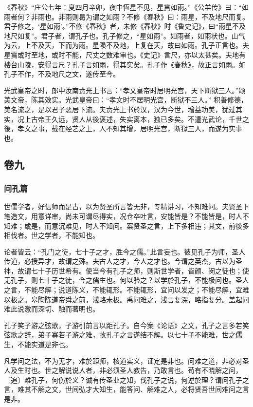 \documentclass[]{article}
\begin{document}
《春秋》``庄公七年：夏四月辛卯，夜中恆星不见，星霣如雨。''《公羊传》曰：``如雨者何？非雨也。非雨则曷为谓之如雨？不修《春秋》曰：雨星，不及地尺而复。君子修之，`星如雨'。''不修《春秋》者，未修《春秋》时《鲁史记》，曰``雨星不及地尺如复''。君子者，谓孔子也。孔子修之，``星如雨''。如雨者，如雨状也。山气为云，上不及天，下而为雨。星陨不及地，上复在天，故曰如雨。孔子正言也。夫星霣或时至地，或时不能，尺丈之数难审也。《史记》言尺，亦以太甚矣。夫地有楼台山陵，安得言尺？孔子言如雨，得其实矣。孔子作《春秋》，故正言如雨。如孔子不作，不及地尺之文，遂传至今。

光武皇帝之时，郎中汝南贲光上书言：``孝文皇帝时居明光宫，天下断狱三人。''颂美文帝，陈其效实。光武皇帝曰：``孝文时不居明光宫，断狱不三人。''
积善修德，美名流之，是以君子恶居下流。夫贲光上书於汉，汉为今世，增益功美，犹过其实，况上古帝王久远，贤人从後褒述，失实离本，独已多矣。不遭光武论，千世之後，孝文之事，载在经艺之上，人不知其增，居明光宫，断狱三人，而遂为实事也。

\hypertarget{header-n367}{%
\subsection{卷九}\label{header-n367}}

\hypertarget{header-n368}{%
\subsubsection{问孔篇}\label{header-n368}}

世儒学者，好信师而是古，以为贤圣所言皆无非，专精讲习，不知难问。夫贤圣下笔造文，用意详审，尚未可谓尽得实，况仓卒吐言，安能皆是？不能皆是，时人不知难；或是，而意沉难见，时人不知问。案贤圣之言，上下多相违；其文，前後多相伐者。世之学者，不能知也。

论者皆云：``孔门之徒，七十子之才，胜今之儒。''此言妄也。彼见孔子为师，圣人传道，必授异才，故谓之殊。夫古人之才，今人之才也。今谓之英杰，古以为圣神，故谓七十子历世希有。使当今有孔子之师，则斯世学者，皆颜、闵之徒也；使无孔子，则七十子之徒，今之儒生也。何以验之？以学於孔子，不能极问也。圣人之言，不能尽解；说道陈义，不能辄形。不能辄形，宜问以发之；不能尽解，宜难以极之。皋陶陈道帝舜之前，浅略未极。禹问难之，浅言复深，略指复分。盖起问难此说激而深切、触而著明也。

孔子笑子游之弦歌，子游引前言以距孔子。自今案《论语》之文，孔子之言多若笑弦歌之辞，弟子寡若子游之难，故孔子之言遂结不解。以七十子不能难，世之儒生，不能实道是非也。

凡学问之法，不为无才，难於距师，核道实义，证定是非也。问难之道，非必对圣人及生时也。世之解说说人者，非必须圣人教告，乃敢言也。苟有不晓解之问，〔追〕难孔子，何伤於义？诚有传圣业之知，伐孔子之说，何逆於理？谓问孔子之言，难其不解之文，世间弘才大知生，能答问、解难之人，必将贤吾世间难问之言是非。
\end{document}
